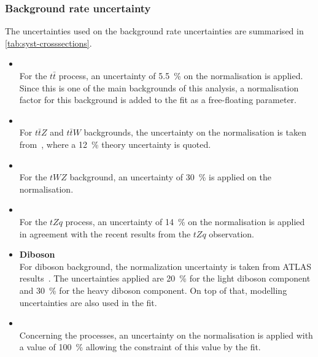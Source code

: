 \subsubsection{Background rate uncertainty} 
The uncertainties used on the background rate uncertainties are summarised in
\cref{tab:syst-crosssections}.
\begin{itemize}
	\item \textbf{\ttbar} \\
	For the $t\bar{t}$ process, an uncertainty of \SI{5.5}{\%} on the normalisation is applied. Since this is one of the main backgrounds of this analysis, a normalisation factor for this background is added to the fit as a free-floating parameter.\\
	\item \textbf{\ttV} \\
	For $t\bar{t}Z$ and $t\bar{t}W$ backgrounds, the uncertainty on the normalisation is taken from~\cite{ATL-COM-PHYS-2018-140}, where a \SI{12}{\%} theory uncertainty is quoted.\\
	\item \textbf{\tWZ} \\
	For the $tWZ$ background, an uncertainty of \SI{30}{\%} is applied on the normalisation.\\
	\item \textbf{\tZq} \\
	For the $tZq$ process, an uncertainty of \SI{14}{\%} on the normalisation is applied in agreement with the recent results from the $tZq$ observation.\\
	\item \textbf{Diboson} \\
	For diboson background, the normalization uncertainty is taken from ATLAS results~\cite{STDM-2018-03}. The uncertainties applied are \SI{20}{\%} for the light diboson component and \SI{30}{\%} for the heavy diboson component. On top of that, modelling uncertainties are also used in the fit.\\
	\item \textbf{\Zjets} \\
	Concerning the \Zjets processes, an uncertainty on the normalisation is applied with a value of \SI{100}{\%} allowing the constraint of this value by the fit.\\
\end{itemize}

